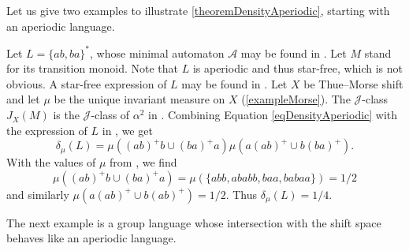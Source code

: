 \documentclass[a4paper,UKenglish,numberwithinsect,cleveref]{lipics-v2021}
\newcommand{\JJ}{\mathrel{\mathscr{J}}}
\newcommand{\A}{\mathcal A}
\begin{document}
Let us give two examples to illustrate   \cref{theoremDensityAperiodic}, starting with an aperiodic language.
\begin{example}\label{example(ab+ba)*}
    Let $L=\{ab,ba\}^*$, whose minimal automaton $\A$ may be found in \cite[Chapter~4, Example~2.1]{book/Pin1986}.  Let $M$ stand for its transition monoid. Note that $L$ is aperiodic and thus star-free, which is not obvious. A star-free expression of $L$ may be found in \cite[Chapter~4, Example~2.1]{book/Pin1986}. Let $X$ be Thue--Morse shift and let $\mu$ be the unique invariant measure on $X$ (\cref{exampleMorse}). The $\JJ$-class $J_X(M)$ is the $\JJ$-class of $\alpha^2$ in \cite[Chapter~4, Example~2.1]{book/Pin1986}.
    Combining Equation \eqref{eqDensityAperiodic} with the expression of $L$ in \cite[Chapter~4, Example~2.1]{book/Pin1986}, we get 
    \begin{equation*}
        \delta_\mu(L)=\mu((ab)^+b\cup (ba)^+a)\mu(a(ab)^+\cup b(ba)^+).
    \end{equation*}
    With the values of $\mu$ from \cite[Example 3.8.20]{DurandPerrin2021}, we find 
    \begin{equation*}
        \mu((ab)^+b\cup (ba)^+a)=\mu(\{abb,ababb,baa,babaa\})=1/2
    \end{equation*}
    and similarly $\mu(a(ab)^+\cup b(ab)^+)=1/2$. Thus $\delta_\mu(L)=1/4$.
\end{example}

The next example is a group language whose intersection with the shift space behaves like an aperiodic language. 
\end{document}
